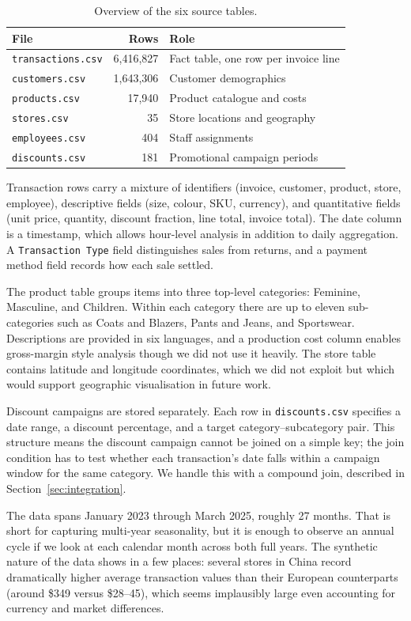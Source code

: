 \documentclass[11pt,a4paper]{article}
\begin{document}
\begin{table}[h]
\centering
\caption{Overview of the six source tables.}
\label{tab:files}
\begin{tabular}{lrl}
\toprule
File & Rows & Role \\
\midrule
\texttt{transactions.csv} & 6,416,827 & Fact table, one row per invoice line \\
\texttt{customers.csv} & 1,643,306 & Customer demographics \\
\texttt{products.csv} & 17,940 & Product catalogue and costs \\
\texttt{stores.csv} & 35 & Store locations and geography \\
\texttt{employees.csv} & 404 & Staff assignments \\
\texttt{discounts.csv} & 181 & Promotional campaign periods \\
\bottomrule
\end{tabular}
\end{table}

Transaction rows carry a mixture of identifiers (invoice, customer, product, store, employee), descriptive fields (size, colour, SKU, currency), and quantitative fields (unit price, quantity, discount fraction, line total, invoice total). The date column is a timestamp, which allows hour-level analysis in addition to daily aggregation. A \texttt{Transaction Type} field distinguishes sales from returns, and a payment method field records how each sale settled.

The product table groups items into three top-level categories: Feminine, Masculine, and Children. Within each category there are up to eleven sub-categories such as Coats and Blazers, Pants and Jeans, and Sportswear. Descriptions are provided in six languages, and a production cost column enables gross-margin style analysis though we did not use it heavily. The store table contains latitude and longitude coordinates, which we did not exploit but which would support geographic visualisation in future work.

Discount campaigns are stored separately. Each row in \texttt{discounts.csv} specifies a date range, a discount percentage, and a target category--subcategory pair. This structure means the discount campaign cannot be joined on a simple key; the join condition has to test whether each transaction's date falls within a campaign window for the same category. We handle this with a compound join, described in Section~\ref{sec:integration}.

The data spans January 2023 through March 2025, roughly 27 months. That is short for capturing multi-year seasonality, but it is enough to observe an annual cycle if we look at each calendar month across both full years. The synthetic nature of the data shows in a few places: several stores in China record dramatically higher average transaction values than their European counterparts (around \$349 versus \$28--45), which seems implausibly large even accounting for currency and market differences.
\end{document}

